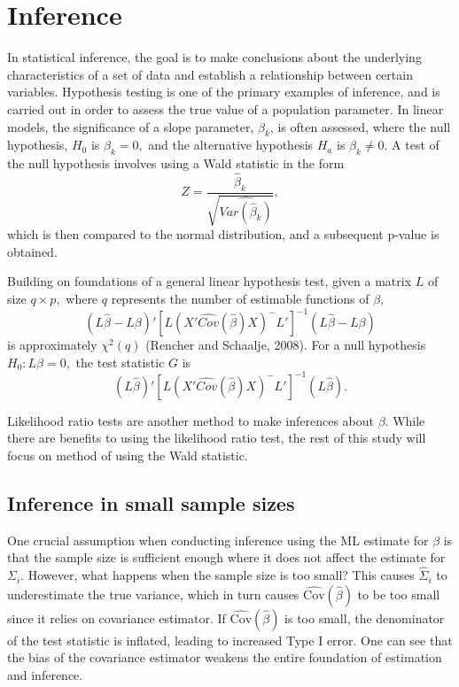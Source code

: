 \documentclass[12pt, twoside]{amherstthesis}
\begin{document}
\hypertarget{inference}{%
\section{Inference}\label{inference}}

In statistical inference, the goal is to make conclusions about the underlying characteristics of a set of data and establish a relationship between certain variables. Hypothesis testing is one of the primary examples of inference, and is carried out in order to assess the true value of a population parameter. In linear models, the significance of a slope parameter, \(\beta_k\), is often assessed, where the null hypothesis, \(H_0\) is \(\beta_k = 0,\) and the alternative hypothesis \(H_a\) is \(\beta_k \neq 0.\) A test of the null hypothesis involves using a Wald statistic in the form \[ Z = \frac{\hat\beta_k}{\sqrt{\widehat{Var(\hat\beta_k)}}},\] which is then compared to the normal distribution, and a subsequent p-value is obtained.

Building on foundations of a general linear hypothesis test, given a matrix \(L\) of size \(q \times p,\) where \(q\) represents the number of estimable functions of \(\beta,\) \[(L\hat\beta-L\beta)'[L(X'\widehat {Cov}(\hat\beta)X)^-L']^{-1}(L\hat\beta-L\beta)
\] is approximately \(\chi^2(q)\) (Rencher and Schaalje, 2008). For a null hypothesis \(H_0: L\beta = 0,\) the test statistic \(G\) is \[(L\hat\beta)'[L(X'\widehat {Cov}(\hat\beta)X)^-L']^{-1}(L\hat\beta).\]

Likelihood ratio tests are another method to make inferences about \(\beta\). While there are benefits to using the likelihood ratio test, the rest of this study will focus on method of using the Wald statistic.

\hypertarget{inference-in-small-sample-sizes}{%
\subsection{Inference in small sample sizes}\label{inference-in-small-sample-sizes}}

One crucial assumption when conducting inference using the ML estimate for \(\beta\) is that the sample size is sufficient enough where it does not affect the estimate for \(\Sigma_i.\) However, what happens when the sample size is too small? This causes \(\hat\Sigma_i\) to underestimate the true variance, which in turn causes \(\widehat {\text{Cov}}(\hat\beta)\) to be too small since it relies on covariance estimator. If \(\widehat {\text{Cov}}(\hat\beta)\) is too small, the denominator of the test statistic is inflated, leading to increased Type I error. One can see that the bias of the covariance estimator weakens the entire foundation of estimation and inference.
\end{document}
